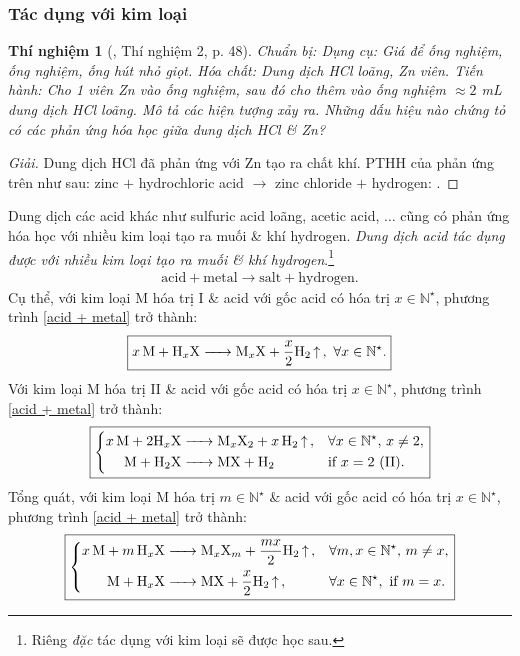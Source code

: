 \documentclass{article}
\newtheorem{thinghiem}{Thí nghiệm}
\begin{document}
\subsubsection{Tác dụng với kim loại}

\begin{thinghiem}[\cite{SGK_KHTN_8_Canh_Dieu}, Thí nghiệm 2, p. 48]
	{\rm Chuẩn bị:} Dụng cụ: Giá để ống nghiệm, ống nghiệm, ống hút nhỏ giọt. Hóa chất: Dung dịch {\rm HCl} loãng, {\rm Zn} viên. {\rm Tiến hành:} Cho 1 viên {\rm Zn} vào ống nghiệm, sau đó cho thêm vào ống nghiệm $\approx 2$ {\rm mL} dung dịch {\rm HCl} loãng. Mô tả các hiện tượng xảy ra. Những dấu hiệu nào chứng tỏ có các phản ứng hóa học giữa dung dịch {\rm HCl} \& {\rm Zn}?
\end{thinghiem}

\begin{proof}[Giải]
	Dung dịch HCl đã phản ứng với Zn tạo ra chất khí. PTHH của phản ứng trên như sau: zinc $+$ hydrochloric acid $\to$ zinc chloride $+$ hydrogen: .
\end{proof}
Dung dịch các acid khác như sulfuric acid loãng, acetic acid, $\ldots$ cũng có phản ứng hóa học với nhiều kim loại tạo ra muối \& khí hydrogen. \textit{Dung dịch acid tác dụng được với nhiều kim loại tạo ra muối \& khí hydrogen}.\footnote{Riêng  \textit{đặc} tác dụng với kim loại sẽ được học sau.}
\begin{align}
	\label{acid + metal}
	\boxed{\mbox{acid} + \mbox{metal}\to\mbox{salt} + \mbox{hydrogen}.}
\end{align}
Cụ thể, với kim loại M hóa trị I \& acid  với gốc acid  có hóa trị $x\in\mathbb{N}^\star$, phương trình \eqref{acid + metal} trở thành:
\begin{align}
	\boxed{\ce{$x$M + H_xX -> M_xX + $\frac{x}{2}$H2 ^},\ \forall x\in\mathbb{N}^\star.}
\end{align}
Với kim loại M hóa trị II \& acid  với gốc acid  có hóa trị $x\in\mathbb{N}^\star$, phương trình \eqref{acid + metal} trở thành:
\begin{equation}
	\boxed{\left\{\begin{split}
			\ce{$x$M + $2$H_xX &-> M_xX2 + $x$H2 ^},&&\forall x\in\mathbb{N}^\star,\,x\ne2,\\
			\ce{M + H2X &-> MX + H2}&&\mbox{if } x = 2\ (\mbox{II}).
		\end{split}\right.}
\end{equation}
Tổng quát, với kim loại M hóa trị $m\in\mathbb{N}^\star$ \& acid  với gốc acid  có hóa trị $x\in\mathbb{N}^\star$, phương trình \eqref{acid + metal} trở thành:
\begin{equation}
	\boxed{\left\{\begin{split}
			\ce{$x$M + $m$H_xX &-> M_xX_m + $\frac{mx}{2}$H2 ^},&&\forall m,x\in\mathbb{N}^\star,\,m\ne x,\\
			\ce{M + H_xX &-> MX + $\frac{x}{2}$H2 ^},&&\forall x\in\mathbb{N}^\star,\mbox{ if } m = x.
		\end{split}\right.}
\end{equation}
\end{document}
